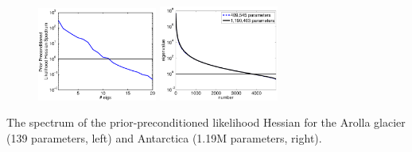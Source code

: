 \documentclass[10pt,final,xcolor=dvipsnames]{beamer}
\begin{document}
\begin{frame}
\begin{itemize}
  \end{itemize}
\begin{figure}[htb]
    \centering\includegraphics[width=0.35\textwidth]{extraplots/spectrum.pdf}
    \hspace{0.2in}
    \centering\includegraphics[width=0.35\textwidth]{extraplots/spec_ppmisfit_hess_coarseandfine_new.pdf}
  \end{figure}
\begin{center}
  The spectrum of the prior-preconditioned likelihood Hessian for the
  Arolla glacier (139 parameters, left) and Antarctica (1.19M
  parameters, right).
  \end{center}
\end{frame}
\end{document}
